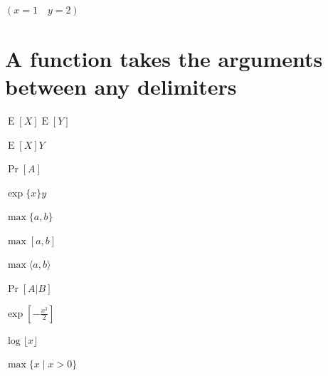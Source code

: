 \documentclass{article}
\begin{document}
$(x=1\quad y=2)$

\section{A function takes the arguments between any delimiters}
$\operatorname{E}[X]\operatorname{E}[Y]$

$\operatorname{E}[X]Y$

$\Pr[A]$

$\exp\{x\}y$

$\max\{a,b\}$

$\max[a,b]$

$\max\langle a,b\rangle$

$\Pr[A|B]$

$\exp\left[-\frac{x^2}{2}\right]$

$\log\lfloor x\rfloor$

$\max\{x\mid x>0\}$
\end{document}
